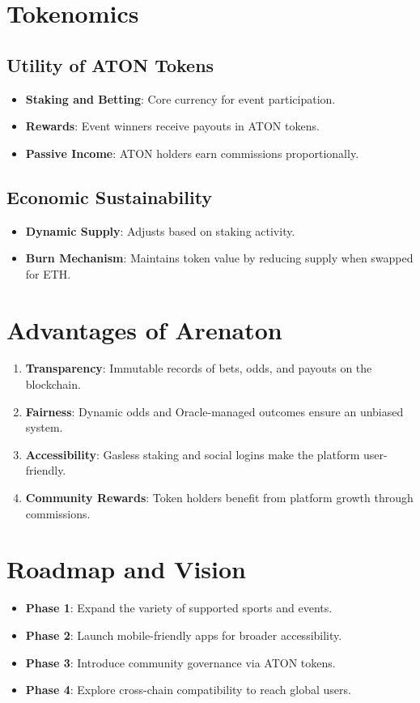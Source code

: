 \documentclass[9pt]{article}
\begin{document}
\begin{multicols}{2}
		\section{Tokenomics}
		\subsection{Utility of ATON Tokens}
		\begin{itemize}
			\item \textbf{Staking and Betting}: Core currency for event participation.
			\item \textbf{Rewards}: Event winners receive payouts in ATON tokens.
			\item \textbf{Passive Income}: ATON holders earn commissions proportionally.
		\end{itemize}
		
		\subsection{Economic Sustainability}
		\begin{itemize}
			\item \textbf{Dynamic Supply}: Adjusts based on staking activity.
			\item \textbf{Burn Mechanism}: Maintains token value by reducing supply when swapped for ETH.
		\end{itemize}
		
		\section{Advantages of Arenaton}
		\begin{enumerate}
			\item \textbf{Transparency}: Immutable records of bets, odds, and payouts on the blockchain.
			\item \textbf{Fairness}: Dynamic odds and Oracle-managed outcomes ensure an unbiased system.
			\item \textbf{Accessibility}: Gasless staking and social logins make the platform user-friendly.
			\item \textbf{Community Rewards}: Token holders benefit from platform growth through commissions.
		\end{enumerate}
		
		\section{Roadmap and Vision}
		\begin{itemize}
			\item \textbf{Phase 1}: Expand the variety of supported sports and events.
			\item \textbf{Phase 2}: Launch mobile-friendly apps for broader accessibility.
			\item \textbf{Phase 3}: Introduce community governance via ATON tokens.
			\item \textbf{Phase 4}: Explore cross-chain compatibility to reach global users.
		\end{itemize}
		

\end{multicols}
\end{document}
